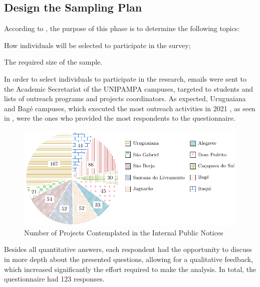 \subsection{Design the Sampling Plan}\label{sec:survey-sampling}

According to , the purpose of this phase is to determine the following topics:
\begin{inparaenum}[(i)]
  \item How individuals will be selected to participate in the survey;
  \item The required size of the sample.
\end{inparaenum}

In order to select individuals to participate in the research, emails were sent to the Academic Secretariat of the \ac{UNIPAMPA} campuses, targeted to students and lists of outreach programs and projects coordinators. As expected, Uruguaiana and Bagé campuses, which executed the most outreach activities in 2021 \cite{relatorio-2021}, as seen in , were the ones who provided the most respondents to the questionnaire.

\begin{figure}[!htb]
  \caption{Number of Projects Contemplated in the Internal Public Notices}\label{fig:number-of-projects}
  \begin{center}
    \includegraphics[width=16cm]{img/5-number-of-projects.pdf}
  \end{center}
\end{figure}

Besides all quantitative answers, each respondent had the opportunity to discuss in more depth about the presented questions, allowing for a qualitative feedback, which increased significantly the effort required to make the analysis. In total, the questionnaire had 123 responses.

